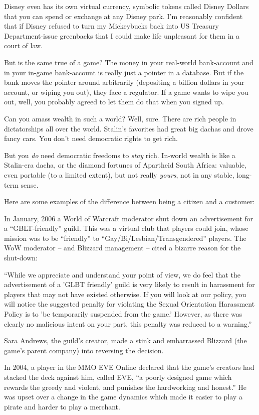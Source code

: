 Disney even has its own virtual currency, symbolic tokens called
Disney Dollars that you can spend or exchange at any Disney park.
I'm reasonably confident that if Disney refused to turn my
Mickeybucks back into US Treasury Department-issue greenbacks that
I could make life unpleasant for them in a court of law.

But is the same true of a game? The money in your real-world
bank-account and in your in-game bank-account is really just a
pointer in a database. But if the bank moves the pointer around
arbitrarily (depositing a billion dollars in your account, or
wiping you out), they face a regulator. If a game wants to wipe you
out, well, you probably agreed to let them do that when you signed
up.

Can you amass wealth in such a world? Well, sure. There are rich
people in dictatorships all over the world. Stalin's favorites had
great big dachas and drove fancy cars. You don't need democratic
rights to get rich.

But you \emph{do} need democratic freedoms to \emph{stay} rich.
In-world wealth is like a Stalin-era dacha, or the diamond fortunes
of Apartheid South Africa: valuable, even portable (to a limited
extent), but not really \emph{yours}, not in any stable,
long-term sense.

Here are some examples of the difference between being a citizen
and a customer:

In January, 2006 a World of Warcraft moderator shut down an
advertisement for a ``GBLT-friendly'' guild. This was a virtual club
that players could join, whose mission was to be ``friendly'' to
``Gay/Bi/Lesbian/Transgendered'' players. The WoW moderator -- and
Blizzard management -- cited a bizarre reason for the shut-down:

``While we appreciate and understand your point of view, we do feel
that the advertisement of a 'GLBT friendly' guild is very likely to
result in harassment for players that may not have existed
otherwise. If you will look at our policy, you will notice the
suggested penalty for violating the Sexual Orientation Harassment
Policy is to 'be temporarily suspended from the game.' However, as
there was clearly no malicious intent on your part, this penalty
was reduced to a warning.''

Sara Andrews, the guild's creator, made a stink and embarrassed
Blizzard (the game's parent company) into reversing the decision.

In 2004, a player in the MMO EVE Online declared that the game's
creators had stacked the deck against him, called EVE, ``a poorly
designed game which rewards the greedy and violent, and punishes
the hardworking and honest.'' He was upset over a change in the game
dynamics which made it easier to play a pirate and harder to play a
merchant.

